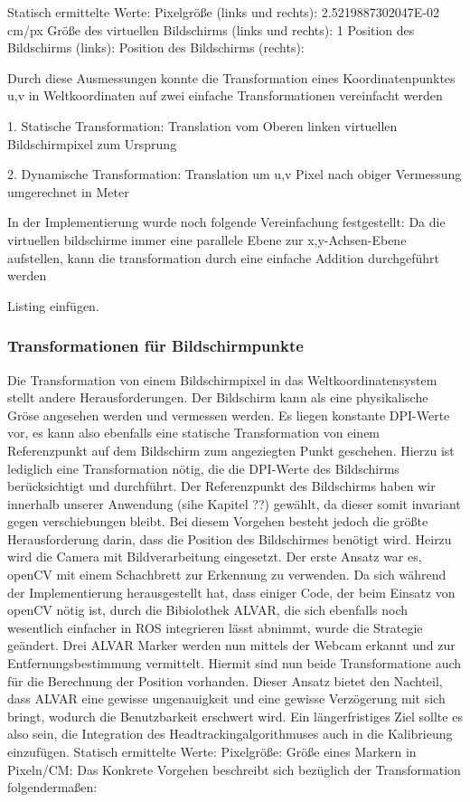     Statisch ermittelte Werte:
    Pixelgröße (links und rechts):      2.5219887302047E-02 cm/px 
    Größe des virtuellen Bildschirms (links und rechts):      1
    Position des Bildschirms (links):
    Position des Bildschirms (rechts):
        
Durch diese Ausmessungen konnte die  Transformation eines Koordinatenpunktes u,v in Weltkoordinaten auf zwei einfache Transformationen vereinfacht werden

    1. Statische Transformation: Translation vom Oberen linken virtuellen Bildschirmpixel zum Ursprung

    2. Dynamische Transformation: Translation um u,v Pixel nach obiger Vermessung umgerechnet in Meter

In der Implementierung wurde noch folgende Vereinfachung festgestellt: Da die virtuellen bildschirme immer eine parallele Ebene zur x,y-Achsen-Ebene aufstellen, kann die transformation durch eine einfache Addition durchgeführt werden

    Listing einfügen.

\subsubsection{Transformationen für Bildschirmpunkte}
Die Transformation von einem Bildschirmpixel in das Weltkoordinatensystem stellt andere Herausforderungen. Der Bildschirm kann als eine physikalische Gröse angesehen werden und vermessen werden. Es liegen konstante DPI-Werte vor, es kann also ebenfalls eine statische Transformation von einem Referenzpunkt auf dem Bildschirm zum angeziegten Punkt geschehen. Hierzu ist lediglich eine Transformation nötig, die die DPI-Werte des Bildschirms berücksichtigt und durchführt. Der Referenzpunkt des Bildschirms haben wir innerhalb unserer Anwendung (sihe Kapitel ??) gewählt, da dieser somit invariant gegen verschiebungen bleibt. Bei diesem Vorgehen besteht jedoch die größte Herausforderung darin, dass die Position des Bildschirmes benötigt wird. Heirzu wird die Camera mit Bildverarbeitung eingesetzt. Der erste Ansatz war es, openCV mit einem Schachbrett zur Erkennung zu verwenden. Da sich während der Implementierung herausgestellt hat, dass einiger Code, der beim Einsatz von openCV nötig ist, durch die Bibiolothek ALVAR, die sich ebenfalls noch wesentlich einfacher in ROS integrieren lässt abnimmt, wurde die Strategie geändert. Drei ALVAR Marker werden nun mittels der Webcam erkannt und zur Entfernungsbestimmung vermittelt. Hiermit sind nun beide Transformatione auch für die Berechnung der Position vorhanden. Dieser Ansatz bietet den Nachteil, dass ALVAR eine gewisse ungenauigkeit und eine gewisse Verzögerung mit sich bringt, wodurch die Benutzbarkeit erschwert wird. Ein längerfristiges Ziel sollte es also sein, die Integration des Headtrackingalgorithmuses auch in die Kalibrieung einzufügen.
    Statisch ermittelte Werte:
    Pixelgröße:
    Größe eines Markern in Pixeln/CM:
Das Konkrete Vorgehen beschreibt sich bezüglich der Transformation folgendermaßen:

